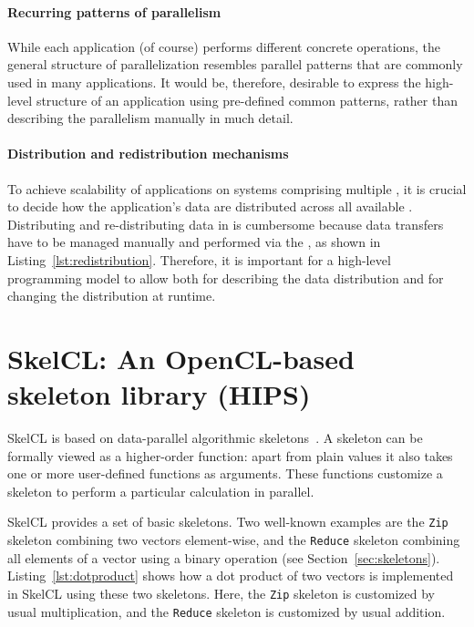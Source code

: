 \paragraph{Recurring patterns of parallelism}
While each application (of course) performs different concrete operations, the general structure of parallelization resembles parallel patterns that are commonly used in many applications.
It would be, therefore, desirable to express the high-level structure of an application using pre-defined common patterns, rather than describing the parallelism manually in much detail.

\paragraph{Distribution and redistribution mechanisms}
To achieve scalability of applications on systems comprising multiple \GPUs, it is crucial to decide how the application's data are distributed across all available \GPUs.
Distributing and re-distributing data in \OpenCL is cumbersome because data transfers have to be managed manually and performed via the \CPU, as shown in Listing~\ref{lst:redistribution}.
Therefore, it is important for a high-level programming model to allow both for describing the data distribution and for changing the distribution at runtime.

%

\section{SkelCL: An OpenCL-based skeleton library (HIPS)}

SkelCL is based on data-parallel algorithmic skeletons~\cite{RaG-03}.
A skeleton can be formally viewed as a higher-order function:
apart from plain values it also takes one or more user-defined functions as arguments.
These functions customize a skeleton to perform a particular calculation in parallel.

SkelCL provides a set of basic skeletons.
Two well-known examples are the \texttt{Zip} skeleton combining two vectors element-wise, and the \texttt{Reduce} skeleton combining all elements of a vector using a binary operation (see Section~\ref{sec:skeletons}).
Listing~\ref{lst:dotproduct} shows how a dot product of two vectors is implemented in SkelCL using these two skeletons.
Here, the \texttt{Zip} skeleton is customized by usual multiplication, and the \texttt{Reduce} skeleton is customized by usual addition.

